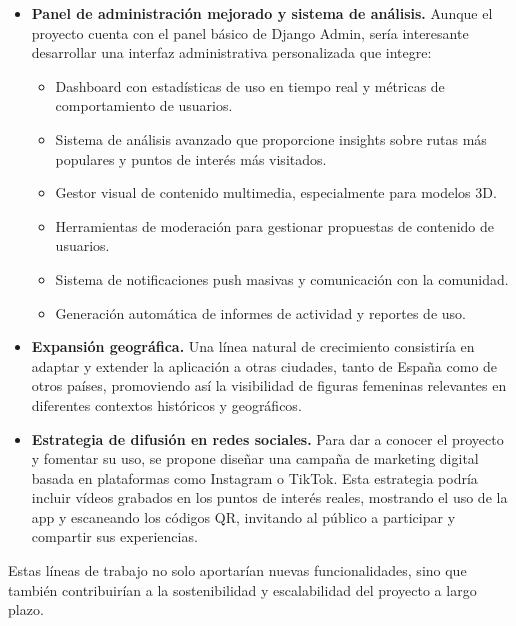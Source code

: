 \begin{itemize}
    
    \item \textbf{Panel de administración mejorado y sistema de análisis.} Aunque el proyecto cuenta con el panel básico de Django Admin, sería interesante desarrollar una interfaz administrativa personalizada que integre:
    \begin{itemize}
        \item Dashboard con estadísticas de uso en tiempo real y métricas de comportamiento de usuarios.
        \item Sistema de análisis avanzado que proporcione insights sobre rutas más populares y puntos de interés más visitados.
        \item Gestor visual de contenido multimedia, especialmente para modelos 3D.
        \item Herramientas de moderación para gestionar propuestas de contenido de usuarios.
        \item Sistema de notificaciones push masivas y comunicación con la comunidad.
        \item Generación automática de informes de actividad y reportes de uso.
    \end{itemize}

    \item \textbf{Expansión geográfica.} Una línea natural de crecimiento consistiría en adaptar y extender la aplicación a otras ciudades, tanto de España como de otros países, promoviendo así la visibilidad de figuras femeninas relevantes en diferentes contextos históricos y geográficos.

    \item \textbf{Estrategia de difusión en redes sociales.} Para dar a conocer el proyecto y fomentar su uso, se propone diseñar una campaña de marketing digital basada en plataformas como Instagram o TikTok. Esta estrategia podría incluir vídeos grabados en los puntos de interés reales, mostrando el uso de la app y escaneando los códigos QR, invitando al público a participar y compartir sus experiencias.
\end{itemize}

Estas líneas de trabajo no solo aportarían nuevas funcionalidades, sino que también contribuirían a la sostenibilidad y escalabilidad del proyecto a largo plazo.
